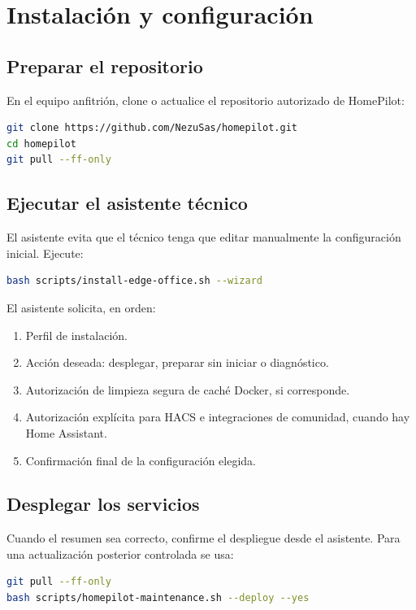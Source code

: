 \section{Instalación y configuración}

\subsection{Preparar el repositorio}
En el equipo anfitrión, clone o actualice el repositorio autorizado de HomePilot:
\begin{lstlisting}[language=bash]
git clone https://github.com/NezuSas/homepilot.git
cd homepilot
git pull --ff-only
\end{lstlisting}

\subsection{Ejecutar el asistente técnico}
El asistente evita que el técnico tenga que editar manualmente la configuración inicial. Ejecute:
\begin{lstlisting}[language=bash]
bash scripts/install-edge-office.sh --wizard
\end{lstlisting}

El asistente solicita, en orden:
\begin{enumerate}[itemsep=0.15cm]
    \item Perfil de instalación.
    \item Acción deseada: desplegar, preparar sin iniciar o diagnóstico.
    \item Autorización de limpieza segura de caché Docker, si corresponde.
    \item Autorización explícita para HACS e integraciones de comunidad, cuando hay Home Assistant.
    \item Confirmación final de la configuración elegida.
\end{enumerate}

\subsection{Desplegar los servicios}
Cuando el resumen sea correcto, confirme el despliegue desde el asistente. Para una actualización posterior controlada se usa:
\begin{lstlisting}[language=bash]
git pull --ff-only
bash scripts/homepilot-maintenance.sh --deploy --yes
\end{lstlisting}

